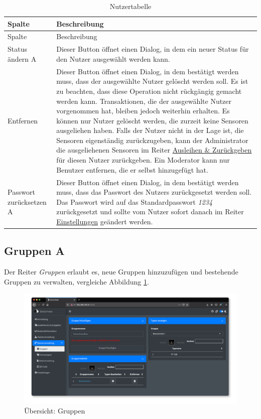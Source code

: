 \documentclass[
]{article}
\begin{document}
\begin{longtable}[]{@{}
  >{\raggedright\arraybackslash}p{}
  >{\raggedright\arraybackslash}p{}@{}}
\caption{\label{tab:user-table} Nutzertabelle}\tabularnewline
\toprule
Spalte & Beschreibung \\
\midrule
\endfirsthead
\toprule
Spalte & Beschreibung \\
\midrule
\endhead
Status ändern A & Dieser Button öffnet einen Dialog, in dem ein neuer Status für den Nutzer ausgewählt werden kann. \\
Entfernen & Dieser Button öffnet einen Dialog, in dem bestätigt werden muss, dass der ausgewählte Nutzer gelöscht werden soll. Es ist zu beachten, dass diese Operation nicht rückgängig gemacht werden kann. Transaktionen, die der ausgewählte Nutzer vorgenommen hat, bleiben jedoch weiterhin erhalten. Es können nur Nutzer gelöscht werden, die zurzeit keine Sensoren ausgeliehen haben. Falls der Nutzer nicht in der Lage ist, die Sensoren eigenständig zurückzugeben, kann der Administrator die ausgeliehenen Sensoren im Reiter \protect\hyperlink{operate}{Ausleihen \& Zurückgeben} für diesen Nutzer zurückgeben. Ein Moderator kann nur Benutzer entfernen, die er selbst hinzugefügt hat. \\
Passwort zurücksetzen A & Dieser Button öffnet einen Dialog, in dem bestätigt werden muss, dass das Passwort des Nutzers zurückgesetzt werden soll. Das Passwort wird auf das Standardpasswort \emph{1234} zurückgesetzt und sollte vom Nutzer sofort danach im Reiter \protect\hyperlink{settings}{Einstellungen} geändert werden. \\
\bottomrule
\end{longtable}

\hypertarget{group}{%
\subsection{Gruppen A}\label{group}}

Der Reiter \emph{Gruppen} erlaubt es, neue Gruppen hinzuzufügen und bestehende Gruppen zu verwalten, vergleiche Abbildung \ref{fig:group-overview}.

\begin{figure}
\centering
\includegraphics{./img/group_overview.png}
\caption{\label{fig:group-overview}Übersicht: Gruppen}
\end{figure}
\end{document}
